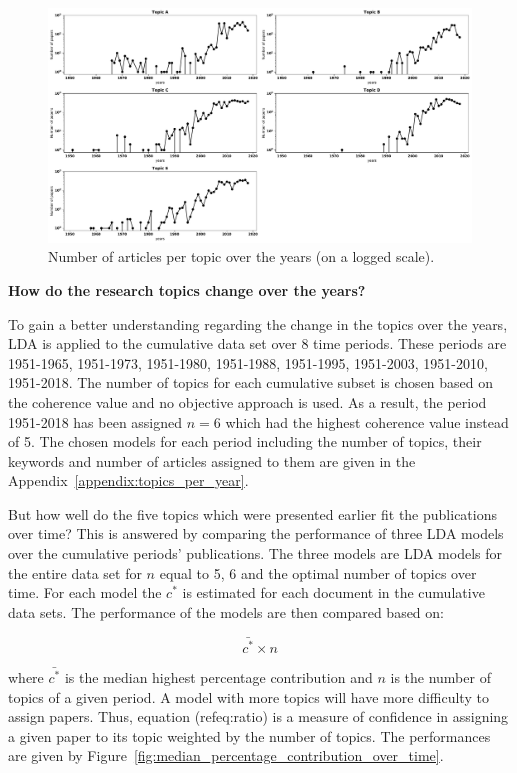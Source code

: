 \documentclass{article}
\theoremstyle{definition}
\begin{document}
\begin{figure}[!hbtp]
    \centering
    \includegraphics[width=\textwidth]{./assets/images/papers_per_topic_over_time.pdf}
    \caption{Number of articles per topic over the years (on a logged scale).}\label{fig:number_of_articles_per_topic}
\end{figure}

\textbf{How do the research topics change over the years?}

To gain a better understanding regarding the change in the topics over the years,
LDA is applied to the cumulative data set over 8 time periods. These periods are
1951-1965, 1951-1973, 1951-1980, 1951-1988, 1951-1995, 1951-2003, 1951-2010,
1951-2018. The number of topics for each cumulative subset is chosen based on
the coherence value and no objective approach is used. As a result, the period
1951-2018 has been assigned \(n=6\) which had the highest coherence
value instead of 5. The chosen models for each period including the
number of topics, their keywords and number of articles assigned to them are
given in the Appendix~\ref{appendix:topics_per_year}.

But how well do the five topics which were presented earlier fit the
publications over time? This is answered by comparing the performance of three
LDA models over the cumulative periods' publications. The three models are LDA
models for the entire data set for \(n\) equal to 5, 6 and the optimal number of topics over time. For
each model the \(c^*\) is estimated for each document in the cumulative data
sets. The performance of the models are then compared based on:

\begin{equation}\label{eq:ratio}
    \bar{c^*} \times n
\end{equation}

where \(\bar{c^*}\) is the median highest percentage contribution and \(n\)
is the number of topics of a given period. A model with more topics will have more
difficulty to assign papers. Thus, equation (ref{eq:ratio}) is a measure of confidence
in assigning a given paper to its topic weighted by the number of topics.
The performances are
given by Figure~\ref{fig:median_percentage_contribution_over_time}.
\end{document}
